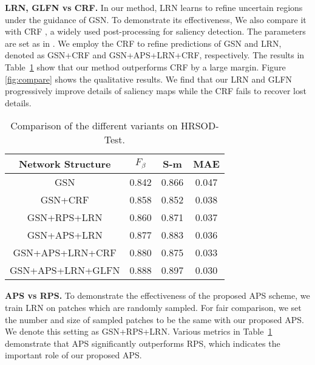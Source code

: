 \documentclass[10pt,twocolumn,letterpaper]{article}
\begin{document}
\textbf{LRN, GLFN vs CRF.} In our method, LRN learns to refine uncertain regions under the guidance of GSN. To demonstrate its effectiveness, We also compare it with CRF \cite{krahenbuhl2011efficient}, a widely used post-processing for saliency detection. The parameters are set as in \cite{hou2017deeply}. We employ the CRF to refine predictions of GSN and LRN, denoted as GSN+CRF and GSN+APS+LRN+CRF, respectively. The results in Table~\ref{tab:cmw_asm} show that our method outperforms CRF by a large margin.
Figure \ref{fig:compare} shows the qualitative results. We find that our LRN and GLFN progressively improve details
of saliency maps while the CRF fails to recover lost details.
\begin{table}[htp]
\setlength{\tabcolsep}{5pt}
\centering
\renewcommand{\arraystretch}{1}
\begin{tabular}{|c|c|c|c|}
\hline
Network Structure&$F_\beta$&S-m& MAE\\
\hline
GSN&0.842&0.866&0.047\\
\hline
GSN+CRF&0.858&0.852&0.038\\
\hline
GSN+RPS+LRN&0.860&0.871&0.037\\
\hline
GSN+APS+LRN&0.877&0.883&0.036\\
\hline
GSN+APS+LRN+CRF&0.880&0.875&0.033\\
\hline
GSN+APS+LRN+GLFN&0.888&0.897&0.030\\
\hline
\end{tabular}
\vspace{0.5mm}
\caption{Comparison of the different variants on HRSOD-Test.}\label{tab:cmw_asm}
\vspace{-3mm}
\end{table}

\textbf{APS vs RPS.} To demonstrate the effectiveness of the proposed APS scheme, we train LRN on patches which are randomly sampled. For fair comparison, we set the number and size of sampled patches to be the same with our proposed APS.
We denote this setting as GSN+RPS+LRN. Various metrics in Table~\ref{tab:cmw_asm}  demonstrate that APS significantly outperforms RPS, which indicates the important role of our proposed APS.
\end{document}

